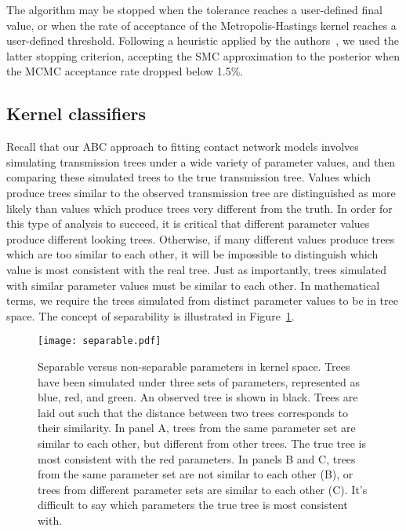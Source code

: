 The algorithm may be stopped when the tolerance reaches a
user-defined final value, or when the rate of acceptance of the
Metropolis-Hastings kernel reaches a user-defined threshold. Following a
heuristic applied by the authors~\autocite{del2012adaptive}, we used the latter
stopping criterion, accepting the SMC approximation to the posterior when the
\gls{MCMC} acceptance rate dropped below 1.5\%.


\subsection{Kernel classifiers}
\label{subsec:kernel}

Recall that our \gls{ABC} approach to fitting contact network models involves
simulating transmission trees under a wide variety of parameter values, and
then comparing these simulated trees to the true transmission tree. Values
which produce trees similar to the observed transmission tree are distinguished
as more likely than values which produce trees very different from the truth.
In order for this type of analysis to succeed, it is critical that different
parameter values produce different looking trees. Otherwise, if many different
values produce trees which are too similar to each other, it will be impossible
to distinguish which value is most consistent with the real tree. Just as
importantly, trees simulated with similar parameter values must be similar to
each other. In mathematical terms, we require the trees simulated from distinct
parameter values to be  in tree space. The concept of
separability is illustrated in Figure~\ref{fig:separable}.

\begin{figure}[ht]
  \centering
  \texttt{[image: separable.pdf]}
  \caption[Separable versus non-separable parameters in kernel space]{
    Separable versus non-separable parameters in kernel space. Trees have been
    simulated under three sets of parameters, represented as blue, red, and
    green. An observed tree is shown in black. Trees are laid out such that
    the distance between two trees corresponds to their similarity. In panel A,
    trees from the same parameter set are similar to each other, but different
    from other trees. The true tree is most consistent with the red parameters.
    In panels B and C, trees from the same parameter set are not similar to
    each other (B), or trees from different parameter sets are similar to each
    other (C). It's difficult to say which parameters the true tree is most
    consistent with.
  }
  \label{fig:separable}
\end{figure}

